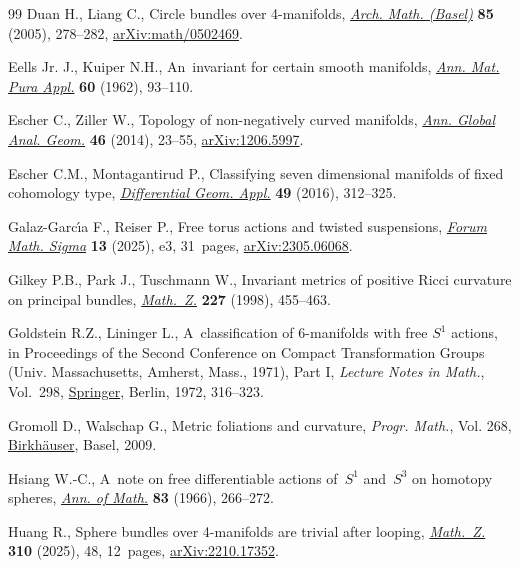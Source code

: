 \begin{thebibliography}{99}
Duan H., Liang C., Circle bundles over 4-manifolds,
  \href{https://doi.org/10.1007/s00013-005-1214-4}{\textit{Arch. Math.
  (Basel)}} \textbf{85} (2005), 278--282,
  \href{https://arxiv.org/abs/math/0502469}{arXiv:math/0502469}.

Eells Jr. J., Kuiper N.H., An~invariant for certain smooth manifolds,
  \href{https://doi.org/10.1007/BF02412768}{\textit{Ann. Mat. Pura Appl.}}
  \textbf{60} (1962), 93--110.

Escher C., Ziller W., Topology of non-negatively curved manifolds,
  \href{https://doi.org/10.1007/s10455-013-9407-8}{\textit{Ann. Global Anal.
  Geom.}} \textbf{46} (2014), 23--55,
  \href{https://arxiv.org/abs/1206.5997}{arXiv:1206.5997}.

Escher C.M., Montagantirud P., Classifying seven dimensional manifolds of fixed
  cohomology type,
  \href{https://doi.org/10.1016/j.difgeo.2016.09.006}{\textit{Differential
  Geom. Appl.}} \textbf{49} (2016), 312--325.

Galaz-Garc\'{\i}a F., Reiser P., Free torus actions and twisted suspensions,
  \href{https://doi.org/10.1017/fms.2024.141}{\textit{Forum Math. Sigma}}
  \textbf{13} (2025), e3, 31~pages,
  \href{https://arxiv.org/abs/2305.06068}{arXiv:2305.06068}.

Gilkey P.B., Park J., Tuschmann W., Invariant metrics of positive {R}icci
  curvature on principal bundles,
  \href{https://doi.org/10.1007/PL00004385}{\textit{Math.~Z.}} \textbf{227}
  (1998), 455--463.

Goldstein R.Z., Lininger L., A~classification of {$6$}-manifolds with free
  {$S^1$} actions, in Proceedings of the {S}econd {C}onference on {C}ompact
  {T}ransformation {G}roups ({U}niv. {M}assachusetts, {A}mherst, {M}ass.,
  1971), {P}art {I}, \textit{Lecture Notes in Math.}, Vol.~298,
  \href{https://doi.org/10.1007/BFb0070052}{Springer}, Berlin, 1972, 316--323.

Gromoll D., Walschap G., Metric foliations and curvature, \textit{Progr.
  Math.}, Vol. 268,
  \href{https://doi.org/10.1007/978-3-7643-8715-0}{Birkh\"auser}, Basel, 2009.

Hsiang W.-C., A~note on free differentiable actions of~{$S^1$} and~{$S^{3}$} on
  homotopy spheres, \href{https://doi.org/10.2307/1970431}{\textit{Ann. of
  Math.}} \textbf{83} (1966), 266--272.

Huang R., Sphere bundles over 4-manifolds are trivial after looping,
  \href{https://doi.org/10.1007/s00209-025-03757-z}{\textit{Math.~Z.}}
  \textbf{310} (2025), 48, 12~pages,
  \href{https://arxiv.org/abs/2210.17352}{arXiv:2210.17352}.


\end{thebibliography}
